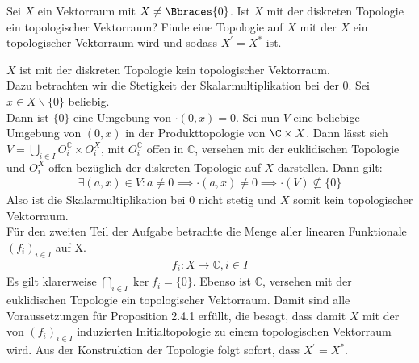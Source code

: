 \begin{exercise}

Sei $X$ ein Vektorraum mit $X \neq \Bbraces{0}$. Ist $X$ mit der diskreten Topologie ein topologischer Vektorraum?
Finde eine Topologie auf $X$ mit der $X$ ein topologischer Vektorraum wird und sodass $X^\prime = X^\ast$ ist.

\end{exercise}

\begin{solution}
$X$ ist mit der diskreten Topologie kein topologischer Vektorraum. \\
Dazu betrachten wir die Stetigkeit der Skalarmultiplikation bei der $0$.
Sei $x \in X\backslash\{0\}$ beliebig. \\
Dann ist $\{0\}$ eine Umgebung von $\cdot(0,x) = 0$.
Sei nun $V$ eine beliebige Umgebung von $(0,x)$ in der Produkttopologie von $\C \times X$.
Dann lässt sich $V = \bigcup_{i \in I}O_i^{\mathbb{C}}\times O_i^X$, mit
$O_i^{\mathbb{C}}$ offen in $\mathbb{C}$, versehen mit der euklidischen Topologie
und $O_i^X$ offen bezüglich der diskreten Topologie auf $X$ darstellen.
Dann gilt:
\begin{align*}
  \exists (a,x) \in V: a \neq 0 \implies \cdot(a,x) \neq 0 \implies \cdot(V) \nsubseteq \{0\}
\end{align*}
Also ist die Skalarmultiplikation bei 0 nicht stetig und $X$ somit kein topologischer
Vektorraum.
\\
Für den zweiten Teil der Aufgabe betrachte die Menge aller linearen Funktionale $(f_i)_{i \in I}$ auf X.
\begin{align*}
  f_i: X \rightarrow \mathbb{C}, i \in I
\end{align*}
Es gilt klarerweise $\bigcap_{i\in I}\ker f_i = \{0\}$.
Ebenso ist $\mathbb{C}$, versehen mit der euklidischen Topologie ein topologischer Vektorraum.
Damit sind alle Voraussetzungen für Proposition 2.4.1 erfüllt, die besagt, dass
damit $X$ mit der von $(f_i)_{i\in I}$ induzierten Initialtopologie zu einem topologischen Vektorraum wird.
Aus der Konstruktion der Topologie folgt sofort, dass $X^\prime = X^\ast$.
\end{solution}
